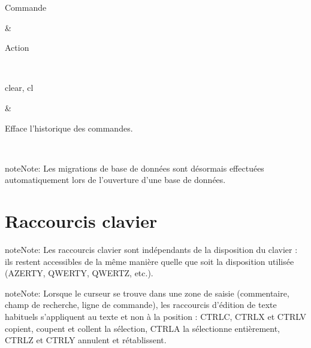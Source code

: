 \documentclass[letterpaper,10pt,french]{sphinxmanual}
\begin{document}
\begin{savenotes}\sphinxattablestart
\sphinxthistablewithglobalstyle
\centering
\begin{tabular}[t]{}
\sphinxtoprule
\begin{varwidth}[t]{}
\sphinxstyletheadfamily \sphinxAtStartPar
Commande
\sphinxbeforeendvarwidth
\end{varwidth}%
&\begin{varwidth}[t]{}
\sphinxstyletheadfamily \sphinxAtStartPar
Action
\sphinxbeforeendvarwidth
\end{varwidth}%
\\
\sphinxmidrule
\sphinxtableatstartofbodyhook\begin{varwidth}[t]{}
\sphinxAtStartPar
clear, cl
\sphinxbeforeendvarwidth
\end{varwidth}%
&\begin{varwidth}[t]{}
\sphinxAtStartPar
Efface l’historique des commandes.
\sphinxbeforeendvarwidth
\end{varwidth}%
\\
\sphinxbottomrule
\end{tabular}
\sphinxtableafterendhook\par
\sphinxattableend\end{savenotes}

\begin{sphinxadmonition}{note}{Note:}
\sphinxAtStartPar
Les migrations de base de données sont désormais effectuées
automatiquement lors de l’ouverture d’une base de données.
\end{sphinxadmonition}

\sphinxstepscope


\section{Raccourcis clavier}
\label{\detokenize{raccourcis:raccourcis-clavier}}\label{\detokenize{raccourcis:raccourcis}}\label{\detokenize{raccourcis::doc}}
\begin{sphinxadmonition}{note}{Note:}
\sphinxAtStartPar
Les raccourcis clavier sont indépendants de la disposition du clavier : ils
restent accessibles de la même manière quelle que soit la disposition
utilisée (AZERTY, QWERTY, QWERTZ, etc.).
\end{sphinxadmonition}

\begin{sphinxadmonition}{note}{Note:}
\sphinxAtStartPar
Lorsque le curseur se trouve dans une zone de saisie (commentaire, champ de
recherche, ligne de commande), les raccourcis d’édition de texte habituels
s’appliquent au texte et non à la position : CTRL\sphinxhyphen{}C, CTRL\sphinxhyphen{}X et CTRL\sphinxhyphen{}V
copient, coupent et collent la sélection, CTRL\sphinxhyphen{}A la sélectionne
entièrement, CTRL\sphinxhyphen{}Z et CTRL\sphinxhyphen{}Y annulent et rétablissent.
\end{sphinxadmonition}
\end{document}
